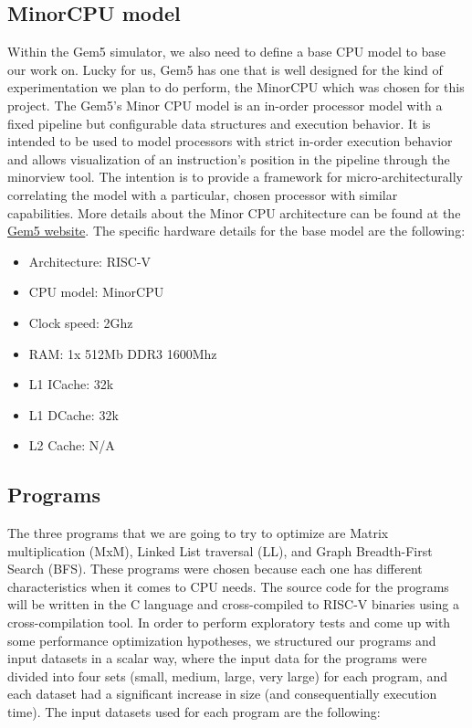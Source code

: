 \documentclass[
	article,			%
	11pt,				%
	oneside,			%
	a4paper,			%
	brazil,				%
        english,			%
	sumario=tradicional
	]{abntex2}
\begin{document}
\subsection{MinorCPU model}
Within the Gem5 simulator, we also need to define a base CPU model to base our work on. Lucky for us, Gem5 has one that is well designed for the kind of experimentation we plan to do perform, the MinorCPU which was chosen for this project.
The Gem5's Minor CPU model is an in-order processor model with a fixed pipeline but configurable data structures and execution behavior. It is intended to be used to model processors with strict in-order execution behavior and allows visualization of an instruction’s position in the pipeline through the minorview tool. The intention is to provide a framework for micro-architecturally correlating the model with a particular, chosen processor with similar capabilities. More details about the Minor CPU architecture can be found at the \href{https://www.gem5.org/documentation/general_docs/cpu_models/minor_cpu}{Gem5 website}. The specific hardware details for the base model are the following:
\begin{itemize}
    \item Architecture: RISC-V
    \item CPU model: MinorCPU
    \item Clock speed: 2Ghz
    \item RAM: 1x 512Mb DDR3 1600Mhz
    \item L1 ICache: 32k
    \item L1 DCache: 32k
    \item L2 Cache: N/A
\end{itemize}

\subsection{Programs}
The three programs that we are going to try to optimize are Matrix multiplication (MxM), Linked List traversal (LL), and Graph Breadth-First Search (BFS). These programs were chosen because each one has different characteristics when it comes to CPU needs. The source code for the programs will be written in the C language and cross-compiled to RISC-V binaries using a cross-compilation tool. In order to perform exploratory tests and come up with some performance optimization hypotheses, we structured our programs and input datasets in a scalar way, where the input data for the programs were divided into four sets (small, medium, large, very large) for each program, and each dataset had a significant increase in size (and consequentially execution time). The input datasets used for each program are the following:
\end{document}
